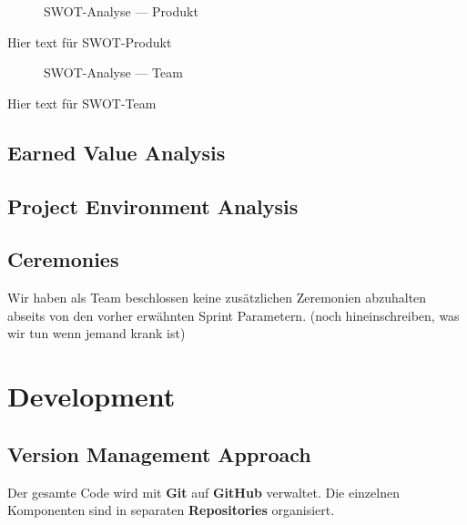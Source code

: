 \documentclass{article}
\begin{document}
\begin{figure}[H]
  \centering
  
  \caption{SWOT-Analyse — Produkt}
  \label{fig:swot-produkt}
\end{figure}

Hier text für SWOT-Produkt

\begin{figure}[H]
  \centering
  
  \caption{SWOT-Analyse — Team}
  \label{fig:swot-team}
\end{figure}

Hier text für SWOT-Team



\subsection{Earned Value Analysis}
\subsection{Project Environment Analysis}
\subsection{Ceremonies}
Wir haben als Team beschlossen keine zusätzlichen Zeremonien abzuhalten abseits von den vorher erwähnten Sprint Parametern.
(noch hineinschreiben, was wir tun wenn jemand krank ist)








\section{Development}
\subsection{Version Management Approach}

Der gesamte Code wird mit \textbf{Git} auf \textbf{GitHub} verwaltet.
Die einzelnen Komponenten sind in separaten \textbf{Repositories} organisiert.
\end{document}
